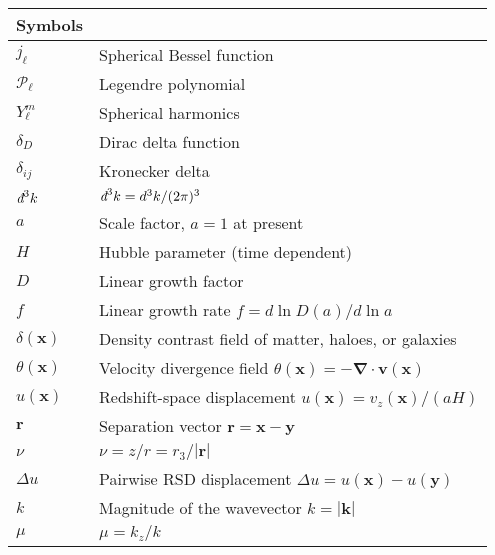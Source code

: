 \documentclass[a4paper,11pt, fleqn]{article}
\newcommand{\dbar}{\textit{\dj}}
\begin{document}
\begin{center}
  \begin{tabular}{ll}
    Symbols & \\
    \hline
    $j_\ell$ & Spherical Bessel function\\
    $\mathcal{P}_\ell$ & Legendre polynomial\\
    $Y_\ell^m$ & Spherical harmonics\\
    $\delta_D$ & Dirac delta function\\
    $\delta_{ij}$ & Kronecker delta\\
    $\dbar^3 k$ & $\dbar^3 k = d^3 k / (2\pi)^3$\\ 
    \hline
    $a$ & Scale factor, $a=1$ at present\\
    $H$ & Hubble parameter (time dependent)\\
    $D$ & Linear growth factor\\
    $f$ & Linear growth rate $f = d \ln D(a)/d\ln a$\\
    $\delta(\bm{x})$ & Density contrast field of matter, haloes, or galaxies\\
    
    $\theta(\bm{x})$ & Velocity divergence field
    $\theta(\bm{x}) = -\bm{\nabla} \cdot \bm{v}(\bm{x})$\\
    $u(\bm{x})$ & Redshift-space displacement $u(\bm{x}) = v_z(\bm{x})/(aH)$\\
    $\bm{r}$ & Separation vector $\bm{r} = \bm{x} - \bm{y}$\\
    $\nu$   & $\nu = z/r = r_3/|\bm{r}|$\\
    $\Delta u$ & Pairwise RSD displacement $\Delta u = u(\bm{x}) - u(\bm{y})$\\
    $k$ & Magnitude of the wavevector $k = |\bm{k}|$\\
    $\mu$ & $\mu=k_z/k$\\
    \hline
  \end{tabular}
\end{center}

%
%
%
\end{document}
